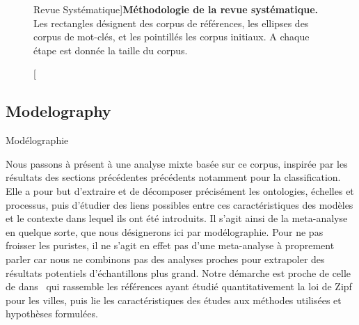 \begin{figure}[h!]
\caption[Systematic Review][Revue Systématique]{\label{fig:modelography:systematicreview}}{\textbf{Méthodologie de la revue systématique.} Les rectangles désignent des corpus de références, les ellipses des corpus de mot-clés, et les pointillés les corpus initiaux. A chaque étape est donnée la taille du corpus.\label{fig:modelography:systematicreview}}
\end{figure}




\subsection{Modelography}{Modélographie}


Nous passons à présent à une analyse mixte basée sur ce corpus, inspirée par les résultats des sections précédentes précédents notamment pour la classification. Elle a pour but d'extraire et de décomposer précisément les ontologies, échelles et processus, puis d'étudier des liens possibles entre ces caractéristiques des modèles et le contexte dans lequel ils ont été introduits. Il s'agit ainsi de la meta-analyse en quelque sorte, que nous désignerons ici par modélographie. Pour ne pas froisser les puristes, il ne s'agit en effet pas d'une meta-analyse à proprement parler car nous ne combinons pas des analyses proches pour extrapoler des résultats potentiels d'échantillons plus grand. Notre démarche est proche de celle de  dans~\cite{2016arXiv160606162C} qui rassemble les références ayant étudié quantitativement la loi de Zipf pour les villes, puis lie les caractéristiques des études aux méthodes utilisées et hypothèses formulées.


